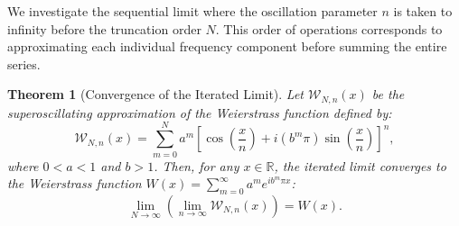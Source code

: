 \documentclass[reqno,11pt]{amsart}
\newtheorem{theorem}{Theorem}[section]
\theoremstyle{definition}
\begin{document}
We investigate the sequential limit where the oscillation parameter $n$ is taken to infinity before the truncation order $N$. This order of operations corresponds to approximating each individual frequency component before summing the entire series.

\begin{theorem}[Convergence of the Iterated Limit]
Let $\mathcal{W}_{N, n}(x)$ be the superoscillating approximation of the Weierstrass function defined by:
\begin{equation} \label{eq:super_weierstrass_def}
    \mathcal{W}_{N, n}(x) = \sum_{m=0}^{N} a^m \left[ \cos\left(\frac{x}{n}\right) + i (b^m \pi) \sin\left(\frac{x}{n}\right) \right]^n,
\end{equation}
where $0 < a < 1$ and $b > 1$. Then, for any $x \in \mathbb{R}$, the iterated limit converges to the Weierstrass function $W(x) = \sum_{m=0}^{\infty} a^m e^{i b^m \pi x}$:
\begin{equation}
    \lim_{N \to \infty} \left( \lim_{n \to \infty} \mathcal{W}_{N, n}(x) \right) = W(x).
\end{equation}
\end{theorem}
\end{document}
